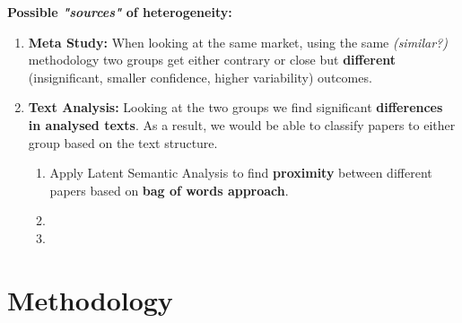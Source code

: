 \documentclass{article}
\begin{document}
\newline \noindent
\textbf{Possible \textit{"sources"} of heterogeneity:}
\begin{enumerate}
    \item \textbf{Meta Study:} When looking at the same market, using the same \textit{(similar?)} methodology two groups get either contrary or close but \textbf{different} (insignificant, smaller confidence, higher variability) outcomes.
    \item \textbf{Text Analysis:} Looking at the two groups we find significant \textbf{differences in analysed texts}. As a result, we would be able to classify papers to either group based on the text structure.
        \begin{enumerate}
            \item Apply Latent Semantic Analysis to find \textbf{proximity} between different papers based on \textbf{bag of words approach}.
             \item
             \item
        \end{enumerate}
\end{enumerate}

\newpage

\section{Methodology}
\end{document}
